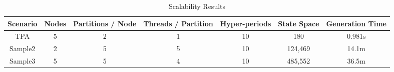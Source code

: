 \begin{table}[t]
	\caption{Scalability Results}
	\label{table:scalability}
	\begin{center}
		\begin{tabular}{ | c | p{1cm} | p{1.7cm} | p{1.7cm} | p{1.4cm} | p{1.3cm} | p{1.7cm} |}
			\hline
			Scenario & Nodes & Partitions / Node & Threads / \mbox{Partition} & Hyper-periods & State Space & Generation Time\\ \hline
			TPA & \multicolumn{1}{|c|}{5} & \multicolumn{1}{|c|}{2} & \multicolumn{1}{|c|}{1} & \multicolumn{1}{|c|}{10} & \multicolumn{1}{|c|}{180} & \multicolumn{1}{|c|}{0.981s}\\ \hline
			Sample2 & \multicolumn{1}{|c|}{2} & \multicolumn{1}{|c|}{5} & \multicolumn{1}{|c|}{5} & \multicolumn{1}{|c|}{10} & \multicolumn{1}{|c|}{124,469} & \multicolumn{1}{|c|}{14.1m} \\ \hline
			Sample3 & \multicolumn{1}{|c|}{5} & \multicolumn{1}{|c|}{5} & \multicolumn{1}{|c|}{4} & \multicolumn{1}{|c|}{10} & \multicolumn{1}{|c|}{485,552} & \multicolumn{1}{|c|}{36.5m} \\ \hline			
		\end{tabular}
	\end{center}
\vspace{-0.2in}
\end{table}

